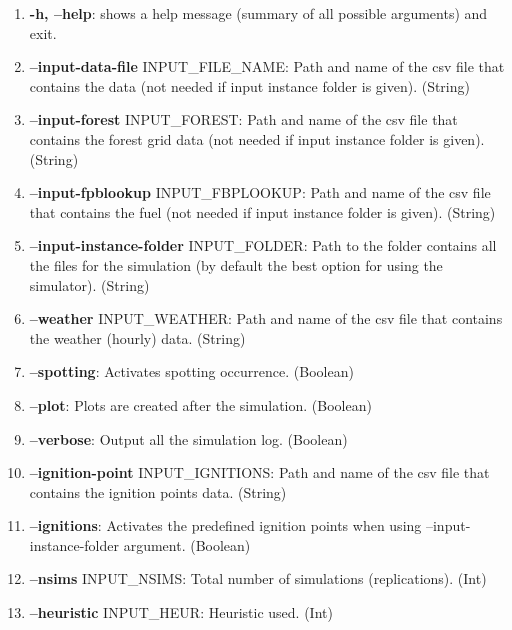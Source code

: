 \documentclass[11pt]{article}
\begin{document}
\begin{enumerate}
\item \textbf{-h, --help}: shows a help message (summary of all possible arguments) and exit.

\item \textbf{--input-data-file} INPUT\_FILE\_NAME: Path and name of the csv file that contains the data (not needed if input instance folder is given). \hfill (String)

\item  \textbf{--input-forest} INPUT\_FOREST:  Path and name of the csv file that contains the forest grid data (not needed if input instance folder is given). \hfill (String)

\item  \textbf{--input-fpblookup} INPUT\_FBPLOOKUP:  Path and name of the csv file that contains the fuel (not needed if input instance folder is given). \hfill (String)

\item  \textbf{--input-instance-folder} INPUT\_FOLDER: Path to the folder contains all the files for the simulation (by default the best option for using the simulator). \hfill (String)
 
\item   \textbf{--weather} INPUT\_WEATHER:  Path and name of the csv file that contains the weather (hourly) data. \hfill (String)

\item \textbf{--spotting}: Activates spotting occurrence. \hfill (Boolean)

\item \textbf{--plot}: Plots are created after the simulation. \hfill (Boolean)

\item \textbf{--verbose}: Output all the simulation log. \hfill (Boolean)

\item \textbf{--ignition-point} INPUT\_IGNITIONS: Path and name of the csv file that contains the ignition points data. \hfill (String)

\item \textbf{--ignitions}: Activates the predefined ignition points when using --input-instance-folder argument. \hfill (Boolean)

\item \textbf{--nsims} INPUT\_NSIMS: Total number of simulations (replications). \hfill (Int)

\item \textbf{--heuristic} INPUT\_HEUR: Heuristic used. \hfill (Int)


\end{enumerate}
\end{document}
